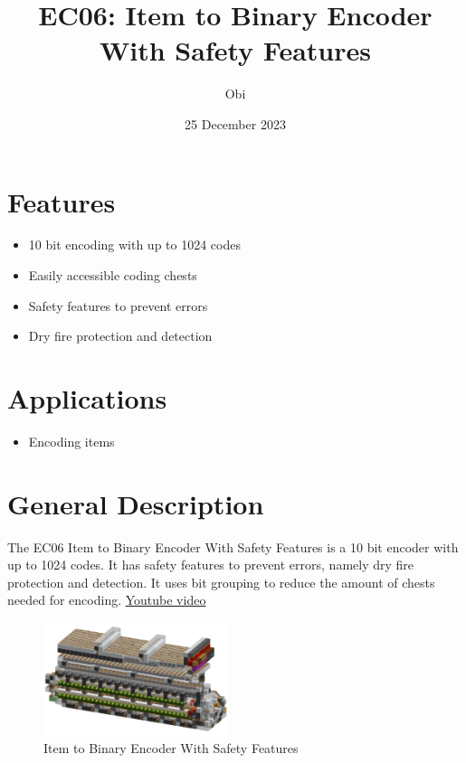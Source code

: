 \documentclass[10pt]{datasheet}
\title{EC06: Item to Binary Encoder With Safety Features}
\author{Obi}
\date{25 December 2023}
\begin{document}
\maketitle

\section{Features}

\begin{itemize}
\item{10 bit encoding with up to 1024 codes}
\item{Easily accessible coding chests}
\item{Safety features to prevent errors}
\item{Dry fire protection and detection}
\end{itemize}

\section{Applications}

\begin{itemize}
\item{Encoding items}
\end{itemize}

\section{General Description}
The EC06 Item to Binary Encoder With Safety Features is a 10 bit encoder with up to 1024 codes. It has safety features to prevent errors, namely dry fire protection and detection. It uses bit grouping to reduce the amount of chests needed for encoding. \href{https://www.youtube.com/watch?v=1jVHZONWJmg}{Youtube video}

\vfill\break

\begin{figure}[h]
    \centering
    \includegraphics[width=0.48\textwidth]{coderpic.png}
    \caption{\centering Item to Binary Encoder With Safety Features}
\end{figure}
\end{document}
